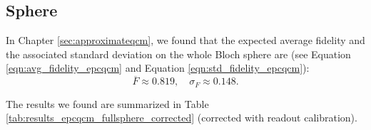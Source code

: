 \subsection{Sphere}

In Chapter \ref{sec:approximateqcm}, we found that the expected average fidelity and the associated standard deviation on the whole Bloch sphere are (see Equation \ref{eqn:avg_fidelity_epcqcm} and Equation \ref{eqn:std_fidelity_epcqcm}):
\[
  \overline{F}\approx0.819, \quad \sigma_{F}\approx0.148.
\]

The results we found are summarized in Table \ref{tab:results_epcqcm_fullsphere_corrected} (corrected with readout calibration).


